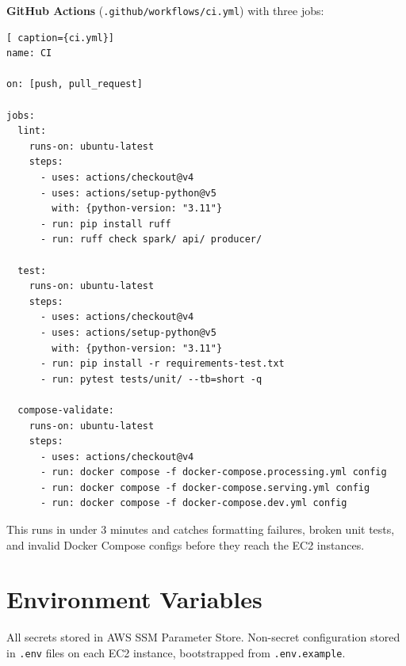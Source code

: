\documentclass[11pt,a4paper]{article}
\begin{document}
\begin{importantbox}
\textbf{GitHub Actions} (\texttt{.github/workflows/ci.yml}) with three jobs:

\begin{lstlisting}[ caption={ci.yml}]
name: CI

on: [push, pull_request]

jobs:
  lint:
    runs-on: ubuntu-latest
    steps:
      - uses: actions/checkout@v4
      - uses: actions/setup-python@v5
        with: {python-version: "3.11"}
      - run: pip install ruff
      - run: ruff check spark/ api/ producer/

  test:
    runs-on: ubuntu-latest
    steps:
      - uses: actions/checkout@v4
      - uses: actions/setup-python@v5
        with: {python-version: "3.11"}
      - run: pip install -r requirements-test.txt
      - run: pytest tests/unit/ --tb=short -q

  compose-validate:
    runs-on: ubuntu-latest
    steps:
      - uses: actions/checkout@v4
      - run: docker compose -f docker-compose.processing.yml config
      - run: docker compose -f docker-compose.serving.yml config
      - run: docker compose -f docker-compose.dev.yml config
\end{lstlisting}

This runs in under 3 minutes and catches formatting failures, broken unit tests, and invalid
Docker Compose configs before they reach the EC2 instances.
\end{importantbox}

\section{Environment Variables}

All secrets stored in AWS SSM Parameter Store. Non-secret configuration stored in \texttt{.env}
files on each EC2 instance, bootstrapped from \texttt{.env.example}.
\end{document}
